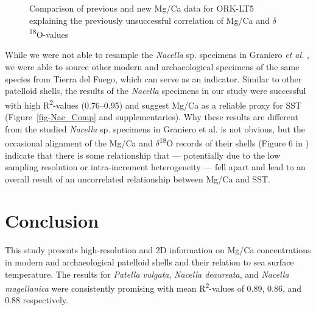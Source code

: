 \documentclass[
  authoryear,
  preprint,
  3p]{elsarticle}
\begin{document}
\begin{figure}


\caption{\label{fig-ORK_sub}Comparison of previous and new Mg/Ca data
for ORK-LT5 explaining the previously unsuccessful correlation of Mg/Ca
and \(\delta\)\textsuperscript{18}O-values}

\end{figure}%

While we were not able to resample the \emph{Nacella} sp. specimens in
Graniero \emph{et al.} \citeyearpar{Graniero2017-io}, we were able to
source other modern and archaeological specimens of the same species
from Tierra del Fuego, which can serve as an indicator. Similar to other
patelloid shells, the results of the \emph{Nacella} specimens in our
study were successful with high R\textsuperscript{2}-values (0.76--0.95)
and suggest Mg/Ca as a reliable proxy for SST (Figure~\ref{fig-Nac_Comp}
and supplementaries). Why these results are different from the studied
\emph{Nacella} sp. specimens in Graniero et al.
\citeyearpar{Graniero2017-io} is not obvious, but the occasional
alignment of the Mg/Ca and \(\delta\)\textsuperscript{18}O records of
their shells (Figure 6 in \citep{Graniero2017-io} ) indicate that there
is some relationship that --- potentially due to the low sampling
resolution or intra-increment heterogeneity --- fell apart and lead to
an overall result of an uncorrelated relationship between Mg/Ca and SST.

\section{Conclusion}\label{conclusion}

This study presents high-resolution and 2D information on Mg/Ca
concentrations in modern and archaeological patelloid shells and their
relation to sea surface temperature. The results for \emph{Patella
vulgata}, \emph{Nacella deaureata}, and \emph{Nacella magellanica} were
consistently promising with mean R\textsuperscript{2}-values of 0.89,
0.86, and 0.88 respectively.
\end{document}
